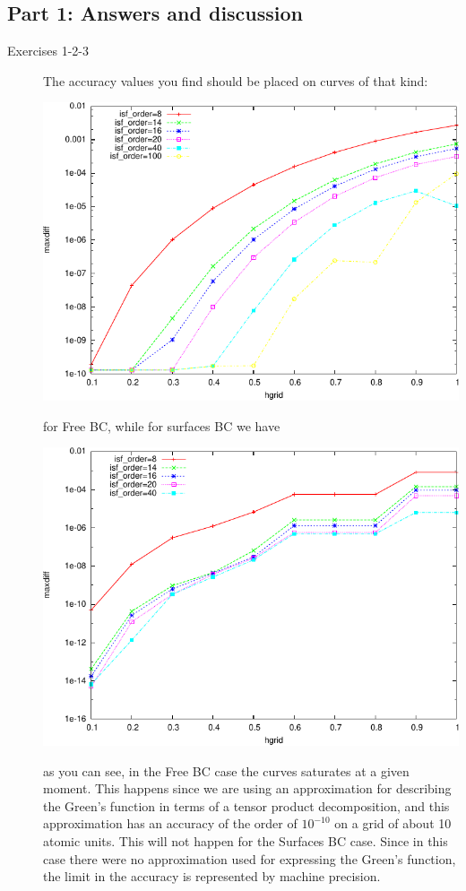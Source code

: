 \documentclass[a4paper]{article}
\begin{document}
\subsection*{Part 1: Answers and discussion}
\begin{description}
 \item[Exercises 1-2-3] The accuracy values you find should be placed on curves of that kind:
\begin{center}
\includegraphics{accF.pdf}
\end{center}
for Free BC, while for surfaces BC we have
\begin{center}
\includegraphics{accS.pdf}
\end{center}
as you can see, in the Free BC case the curves saturates at a given moment. This happens since we are using an approximation for describing the Green's function in terms of a tensor product decomposition, and this approximation has an accuracy of the order of $10^{-10}$ on a grid of about 10 atomic units. This will not happen for the Surfaces BC case. Since in this case there were no approximation used for expressing the Green's function, the limit in the accuracy is represented by machine precision.


\end{description}
\end{document}
